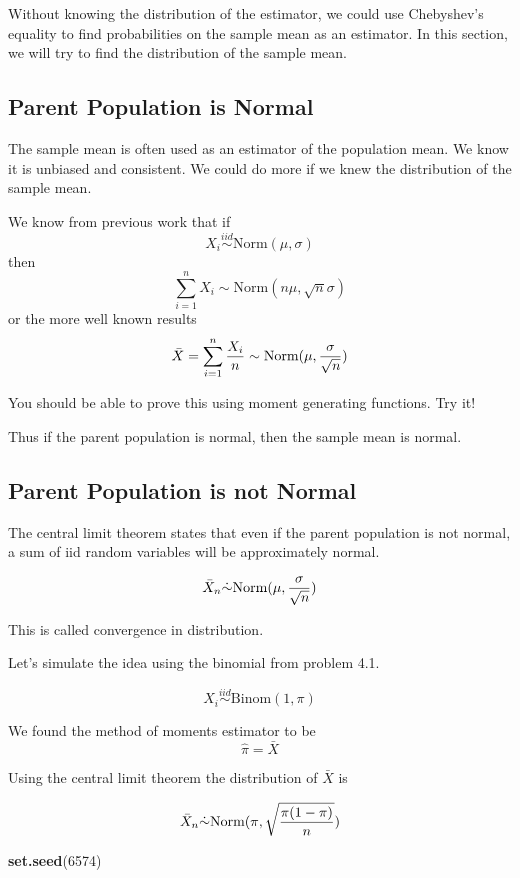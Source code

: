 \documentclass[]{book}
\newenvironment{Shaded}{\begin{snugshade}}{\end{snugshade}}
\newcommand{\KeywordTok}[1]{\textcolor[rgb]{0.13,0.29,0.53}{\textbf{#1}}}
\newcommand{\DecValTok}[1]{\textcolor[rgb]{0.00,0.00,0.81}{#1}}
\newcommand{\NormalTok}[1]{#1}
\theoremstyle{definition}
\theoremstyle{definition}
\theoremstyle{definition}
\theoremstyle{remark}
\begin{document}
Without knowing the distribution of the estimator, we could use
Chebyshev's equality to find probabilities on the sample mean as an
estimator. In this section, we will try to find the distribution of the
sample mean.

\subsection{Parent Population is
Normal}\label{parent-population-is-normal}

The sample mean is often used as an estimator of the population mean. We
know it is unbiased and consistent. We could do more if we knew the
distribution of the sample mean.

We know from previous work that if
\[X_{i} \overset{iid}{\sim}\mbox{Norm}(\mu,\sigma)\] then
\[\sum_{i=1}^{n}X_{i} \sim\mbox{Norm}(n\mu,\sqrt{n}\sigma)\] or the more
well known results
\[\bar{X}=\sum_{i=1}^{n}{X_{i} \over n} \sim \mbox{Norm}(\mu,{\sigma \over \sqrt{n}})\]

You should be able to prove this using moment generating functions. Try
it!

Thus if the parent population is normal, then the sample mean is normal.

\subsection{Parent Population is not
Normal}\label{parent-population-is-not-normal}

The central limit theorem states that even if the parent population is
not normal, a sum of iid random variables will be approximately normal.

\[\bar{X}_{n} \dot{\sim} \mbox{Norm}(\mu,{\sigma \over \sqrt{n}})\]

This is called convergence in distribution.

Let's simulate the idea using the binomial from problem 4.1.

\[X_{i} \overset{iid}{\sim}\mbox{Binom}(1,\pi)\]

We found the method of moments estimator to be \[\hat{\pi}=\bar{X}\]

Using the central limit theorem the distribution of \(\bar{X}\) is

\[\bar{X}_{n} \dot{\sim} \mbox{Norm}(\pi,\sqrt{{\pi(1-\pi) \over n}})\]

\begin{Shaded}
\begin{Highlighting}[]
\KeywordTok{set.seed}\NormalTok{(}\DecValTok{6574}\NormalTok{)}
\end{Highlighting}
\end{Shaded}
\end{document}
